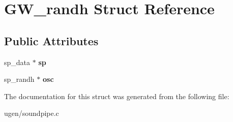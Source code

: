 \hypertarget{structGW__randh}{}\section{G\+W\+\_\+randh Struct Reference}
\label{structGW__randh}
\subsection*{Public Attributes}
\begin{DoxyCompactItemize}
\item 
\hypertarget{structGW__randh_a5565d514d87ec6c5b5d476676f7eb02a}{}\label{structGW__randh_a5565d514d87ec6c5b5d476676f7eb02a} 
sp\+\_\+data $\ast$ {\bfseries sp}
\item 
\hypertarget{structGW__randh_a8c0dc9a45c08eb20dc7a1f9d6cf9b901}{}\label{structGW__randh_a8c0dc9a45c08eb20dc7a1f9d6cf9b901} 
sp\+\_\+randh $\ast$ {\bfseries osc}
\end{DoxyCompactItemize}


The documentation for this struct was generated from the following file\+:\begin{DoxyCompactItemize}
\item 
ugen/soundpipe.\+c\end{DoxyCompactItemize}
